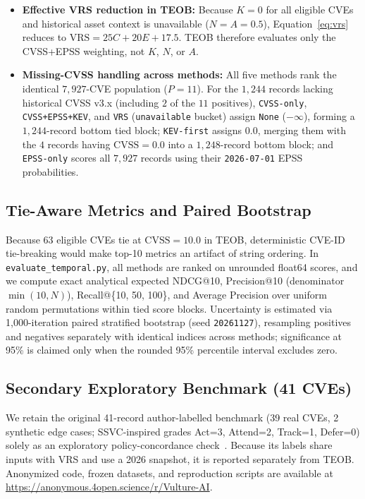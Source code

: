 \documentclass[conference]{IEEEtran}
\begin{document}
\begin{itemize}
    \item \textbf{Effective VRS reduction in TEOB:} Because $K=0$ for all eligible CVEs and historical asset context is unavailable ($N=A=0.5$), Equation~\ref{eq:vrs} reduces to $\text{VRS} = 25C + 20E + 17.5$. TEOB therefore evaluates only the CVSS+EPSS weighting, not $K$, $N$, or $A$.
    \item \textbf{Missing-CVSS handling across methods:} All five methods rank the identical $7{,}927$-CVE population ($P=11$). For the $1{,}244$ records lacking historical CVSS v3.x (including $2$ of the $11$ positives), \texttt{CVSS-only}, \texttt{CVSS+EPSS+KEV}, and \texttt{VRS} (\texttt{unavailable} bucket) assign \texttt{None} ($-\infty$), forming a $1{,}244$-record bottom tied block; \texttt{KEV-first} assigns $0.0$, merging them with the $4$ records having $\text{CVSS}=0.0$ into a $1{,}248$-record bottom block; and \texttt{EPSS-only} scores all $7{,}927$ records using their \texttt{2026-07-01} EPSS probabilities.
\end{itemize}

\subsection{Tie-Aware Metrics and Paired Bootstrap}
Because 63 eligible CVEs tie at $\text{CVSS}=10.0$ in TEOB, deterministic CVE-ID tie-breaking would make top-10 metrics an artifact of string ordering. In \texttt{evaluate\_temporal.py}, all methods are ranked on unrounded float64 scores, and we compute exact analytical expected NDCG@10, Precision@10 (denominator $\min(10, N)$), Recall@\{10, 50, 100\}, and Average Precision over uniform random permutations within tied score blocks. Uncertainty is estimated via 1,000-iteration paired stratified bootstrap (seed \texttt{20261127}), resampling positives and negatives separately with identical indices across methods; significance at 95\% is claimed only when the rounded 95\% percentile interval excludes zero.

\subsection{Secondary Exploratory Benchmark (41 CVEs)}
We retain the original 41-record author-labelled benchmark (39 real CVEs, 2 synthetic edge cases; SSVC-inspired grades Act=3, Attend=2, Track=1, Defer=0) solely as an exploratory policy-concordance check~\cite{nvd2023}. Because its labels share inputs with VRS and use a 2026 snapshot, it is reported separately from TEOB. Anonymized code, frozen datasets, and reproduction scripts are available at \url{https://anonymous.4open.science/r/Vulture-AI}.
\end{document}
